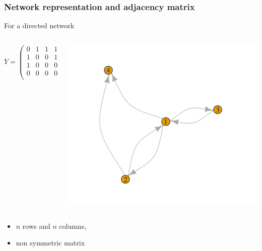 \documentclass[compress,10pt]{beamer}
\begin{document}
\begin{frame}
\frametitle{Network representation and adjacency matrix}

For a directed network
 \begin{columns}
 \begin{column}{.45\paperwidth}
$$Y=\left(
\begin{array}{rrrrr}
0 & 1 & 1 & 1 \\ 
 1 & 0 & 0 & 1 \\ 
 1 & 0 & 0 & 0 \\ 
 0 & 0 & 0 & 0 \\ 
\end{array}\right)
$$
\end{column}

\begin{column}{.5\paperwidth}

\includegraphics[scale=.5]{plots/graphe_adj_dir.png}

\end{column}

\end{columns}

\begin{itemize}
\item $n$ rows and $n$ columns,
\item non symmetric   matrix
\end{itemize}

\end{frame}


\end{document}

